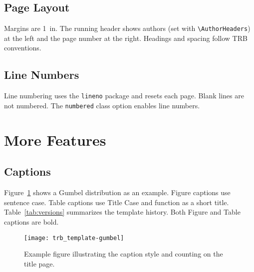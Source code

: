 \documentclass[numbered]{trbunofficial2}
\begin{document}
\subsection{Page Layout}
Margins are 1~in. The running header shows authors (set with \verb|\AuthorHeaders|) at the left and the page number at the right. Headings and spacing follow TRB conventions.

\subsection{Line Numbers}
Line numbering uses the \verb|lineno| package and resets each page. Blank lines are not numbered. The \verb|numbered| class option enables line numbers.

\section{More Features}

\subsection{Captions}
Figure~\ref{fig:trial} shows a Gumbel distribution as an example. Figure captions use sentence case.  Table captions use Title Case and function as a short title. Table~\ref{tab:versions} summarizes the template history.  Both Figure and Table captions are bold.

\begin{figure}[htbp]
  \centering
  \texttt{[image: trb\_template-gumbel]}
  \caption{Example figure illustrating the caption style and counting on the title page.}\label{fig:trial}
\end{figure}
\end{document}
